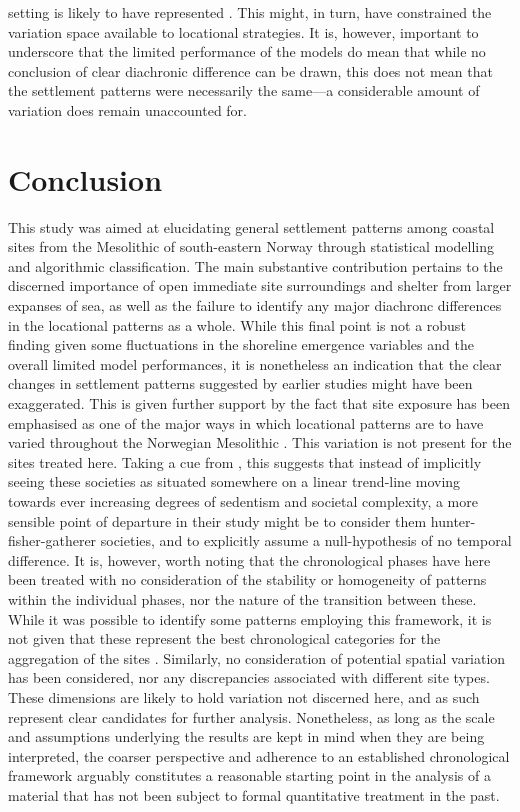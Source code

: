 \documentclass[12pt, a4paper]{article}
\begin{document}
setting is likely to have represented \citep[][]{glorstad2013}. This might, in turn, have constrained the variation space available to locational strategies. It is, however, important to underscore that the limited performance of the models do mean that while no conclusion of clear diachronic difference can be drawn, this does not mean that the settlement patterns were necessarily the same---a considerable amount of variation does remain unaccounted for.

\section{Conclusion}
This study was aimed at elucidating general settlement patterns among coastal sites from the Mesolithic of south-eastern Norway through statistical modelling and algorithmic classification. The main substantive contribution pertains to the discerned importance of open immediate site surroundings and shelter from larger expanses of sea, as well as the failure to identify any major diachronc differences in the locational patterns as a whole. While this final point is not a robust finding given some fluctuations in the shoreline emergence variables and the overall limited model performances, it is nonetheless an indication that the clear changes in settlement patterns suggested by earlier studies might have been exaggerated. This is given further support by the fact that site exposure has been emphasised as one of the major ways in which locational patterns are to have varied throughout the Norwegian Mesolithic \citep[e.g.][]{breivik2014}. This variation is not present for the sites treated here. Taking a cue from \cite{aastveit2014}, this suggests that instead of implicitly seeing these societies as situated somewhere on a linear trend-line moving towards ever increasing degrees of sedentism and societal complexity, a more sensible point of departure in their study might be to consider them hunter-fisher-gatherer societies, and to explicitly assume a null-hypothesis of no temporal difference. It is, however, worth noting that the chronological phases have here been treated with no consideration of the stability or homogeneity of patterns within the individual phases, nor the nature of the transition between these. While it was possible to identify some patterns employing this framework, it is not given that these represent the best chronological categories for the aggregation of the sites \citep{reitan2016}. Similarly, no consideration of potential spatial variation has been considered, nor any discrepancies associated with different site types. These dimensions are likely to hold variation not discerned here, and as such represent clear candidates for further analysis. Nonetheless, as long as the scale and assumptions underlying the results are kept in mind when they are being interpreted, the coarser perspective and adherence to an established chronological framework arguably constitutes a reasonable starting point in the analysis of a material that has not been subject to formal quantitative treatment in the past.\par
\end{document}
